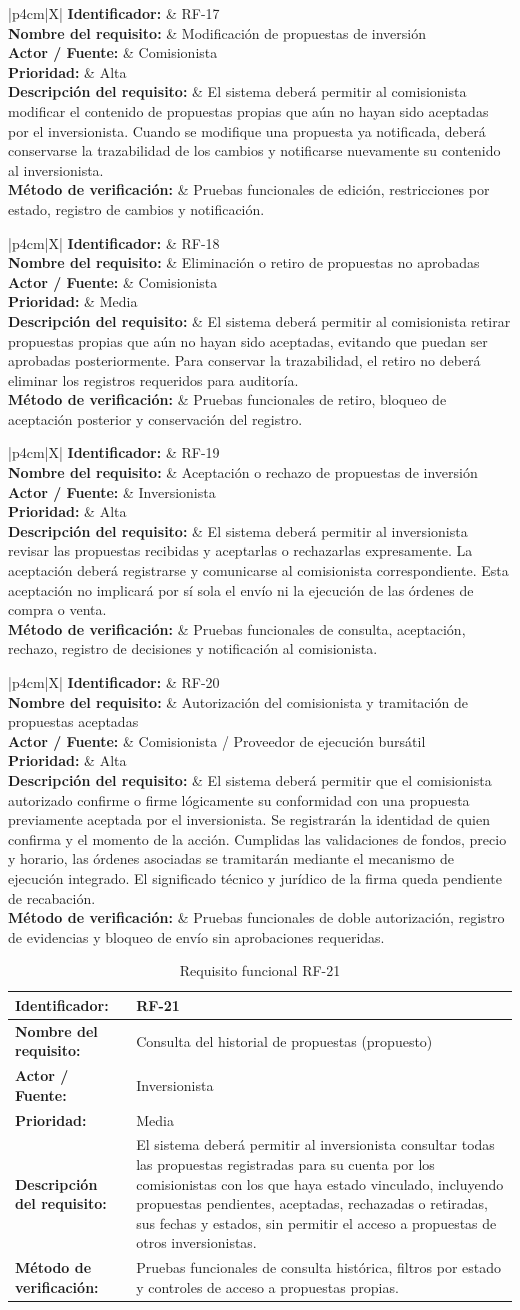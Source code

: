 \documentclass[11pt,a4paper,oneside]{article}
\newcommand{\tablaRequisito}[6]{%
\begin{table}[H]
\centering
\begin{tabularx}{\linewidth}{|p{4cm}|X|}
\hline
\textbf{Identificador:} & #1 \\ \hline
\textbf{Nombre del requisito:} & #2 \\ \hline
\textbf{Actor / Fuente:} & #3 \\ \hline
\textbf{Prioridad:} & #4 \\ \hline
\textbf{Descripción del requisito:} &
#5 \\ \hline
\textbf{Método de verificación:} & #6 \\ \hline
\end{tabularx}
\caption{Requisito funcional #1}
\label{tab:#1}
\end{table}
}
\begin{document}
\tablaRequisito
{RF-17}
{Modificación de propuestas de inversión}
{Comisionista}
{Alta}
{El sistema deberá permitir al comisionista modificar el contenido de propuestas propias que aún no hayan sido aceptadas por el inversionista. Cuando se modifique una propuesta ya notificada, deberá conservarse la trazabilidad de los cambios y notificarse nuevamente su contenido al inversionista.}
{Pruebas funcionales de edición, restricciones por estado, registro de cambios y notificación.}


\tablaRequisito
{RF-18}
{Eliminación o retiro de propuestas no aprobadas}
{Comisionista}
{Media}
{El sistema deberá permitir al comisionista retirar propuestas propias que aún no hayan sido aceptadas, evitando que puedan ser aprobadas posteriormente. Para conservar la trazabilidad, el retiro no deberá eliminar los registros requeridos para auditoría.}
{Pruebas funcionales de retiro, bloqueo de aceptación posterior y conservación del registro.}


\tablaRequisito
{RF-19}
{Aceptación o rechazo de propuestas de inversión}
{Inversionista}
{Alta}
{El sistema deberá permitir al inversionista revisar las propuestas recibidas y aceptarlas o rechazarlas expresamente. La aceptación deberá registrarse y comunicarse al comisionista correspondiente. Esta aceptación no implicará por sí sola el envío ni la ejecución de las órdenes de compra o venta.}
{Pruebas funcionales de consulta, aceptación, rechazo, registro de decisiones y notificación al comisionista.}


\tablaRequisito
{RF-20}
{Autorización del comisionista y tramitación de propuestas aceptadas}
{Comisionista / Proveedor de ejecución bursátil}
{Alta}
{El sistema deberá permitir que el comisionista autorizado confirme o firme lógicamente su conformidad con una propuesta previamente aceptada por el inversionista. Se registrarán la identidad de quien confirma y el momento de la acción. Cumplidas las validaciones de fondos, precio y horario, las órdenes asociadas se tramitarán mediante el mecanismo de ejecución integrado. El significado técnico y jurídico de la firma queda pendiente de recabación.}
{Pruebas funcionales de doble autorización, registro de evidencias y bloqueo de envío sin aprobaciones requeridas.}


\tablaRequisito
{RF-21}
{Consulta del historial de propuestas (propuesto)}
{Inversionista}
{Media}
{El sistema deberá permitir al inversionista consultar todas las propuestas registradas para su cuenta por los comisionistas con los que haya estado vinculado, incluyendo propuestas pendientes, aceptadas, rechazadas o retiradas, sus fechas y estados, sin permitir el acceso a propuestas de otros inversionistas.}
{Pruebas funcionales de consulta histórica, filtros por estado y controles de acceso a propuestas propias.}
\end{document}
